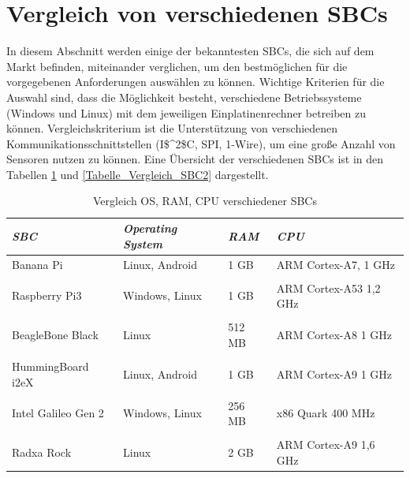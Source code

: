 \section{Vergleich von verschiedenen SBCs}
\label{section_Vergleich_SBC}
In diesem Abschnitt werden einige der bekanntesten \acp{SBC}, die sich auf dem Markt befinden, miteinander verglichen, um den bestmöglichen für die vorgegebenen Anforderungen auswählen zu können.
Wichtige Kriterien für die Auswahl sind, dass die Möglichkeit besteht, verschiedene Betriebssysteme (Windows und Linux) mit dem jeweiligen Einplatinenrechner betreiben zu können. Vergleichskriterium ist die Unterstützung von verschiedenen Kommunikationsschnittstellen (\ac{I$^2$C}, \ac{SPI}, 1-Wire), um eine große Anzahl von Sensoren nutzen zu können. Eine Übersicht der verschiedenen \acp{SBC} ist in den Tabellen \ref{Tabelle_Vergleich_SBC1} und \ref{Tabelle_Vergleich_SBC2} dargestellt.

\begin{table}[H]
\centering
\begin{tabular}{
llll
}
\toprule
\multicolumn{1}{p{3cm}}{\textit{\ac{SBC}}} & \multicolumn{1}{p{3.5cm}}{\textit{Operating System} } & \multicolumn{1}{p{1,5cm}}{\textit{RAM} }&\multicolumn{1}{p{3cm}}{ \centering\textit{CPU} }\\\midrule
Banana Pi & Linux, Android & 1 GB & ARM Cortex-A7, 1 GHz\\
&&&\\
Raspberry Pi3&Windows, Linux&1 GB&ARM Cortex-A53 1,2 GHz\\
&&&\\
BeagleBone Black & Linux & 512 MB & ARM Cortex-A8 1 GHz\\
&&&\\
HummingBoard i2eX & Linux, Android & 1 GB & ARM Cortex-A9 1 GHz\\
&&&\\
Intel Galileo Gen 2 & Windows, Linux & 256 MB & x86 Quark 400 MHz\\
&&&\\
Radxa Rock & Linux & 2 GB & ARM Cortex-A9 1,6 GHz\\
\bottomrule
\end{tabular}
\caption{Vergleich OS, RAM, CPU verschiedener SBCs}
\label{Tabelle_Vergleich_SBC1}
\end{table}


